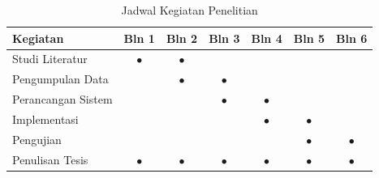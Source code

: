 \begin{table}[htbp]
    \caption{Jadwal Kegiatan Penelitian}
    \label{tab:jadwal}
    \centering
    \begin{tabular}{|l|c|c|c|c|c|c|}
        \hline
        \textbf{Kegiatan} & \textbf{Bln 1} & \textbf{Bln 2} & \textbf{Bln 3} & \textbf{Bln 4} & \textbf{Bln 5} & \textbf{Bln 6} \\
        \hline
        Studi Literatur & $\bullet$ & $\bullet$ & & & & \\
        \hline
        Pengumpulan Data & & $\bullet$ & $\bullet$ & & & \\
        \hline
        Perancangan Sistem & & & $\bullet$ & $\bullet$ & & \\
        \hline
        Implementasi & & & & $\bullet$ & $\bullet$ & \\
        \hline
        Pengujian & & & & & $\bullet$ & $\bullet$ \\
        \hline
        Penulisan Tesis & $\bullet$ & $\bullet$ & $\bullet$ & $\bullet$ & $\bullet$ & $\bullet$ \\
        \hline
    \end{tabular}
\end{table}

